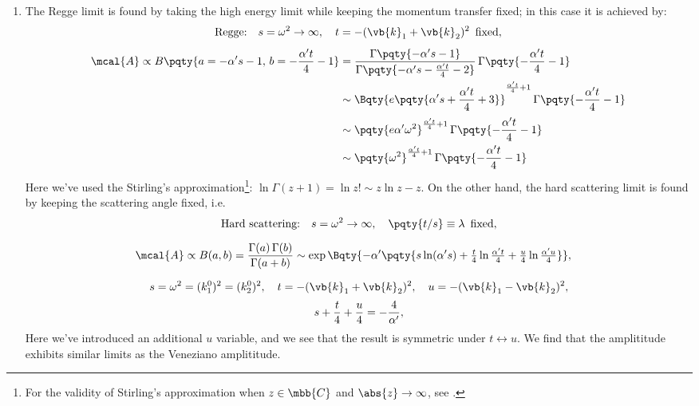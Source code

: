 \documentclass[a4paper,10pt]{article}
\begin{document}
\begin{enumerate}
\begin{enumerate}
	\item The Regge limit is found by taking the high energy limit while keeping the momentum transfer fixed; in this case it is achieved by:
	\begin{gather}
		\text{Regge:}\quad
			s = \omega^2 \to\infty,\quad
			t = - (\vb{k}_1 + \vb{k}_2)^2
				\,\ \text{fixed},
	\\[1ex]
	\begin{aligned}
		\mcal{A} \propto
			B\pqty{
				a = -\alpha's - 1,\,
				b = -\frac{\alpha't}{4} - 1
			}
		&= \frac{\Gamma\pqty{
				-\alpha's - 1
			}}{\Gamma\pqty{
				-\alpha's - \frac{\alpha't}{4} - 2
			}}\,
			\Gamma\pqty{-\frac{\alpha't}{4} - 1} \\
		&\sim \Bqty{
				e\pqty{
					\alpha's
					+ \frac{\alpha't}{4} + 3
				}
			}^{\frac{\alpha't}{4} + 1}\,
			\Gamma\pqty{-\frac{\alpha't}{4} - 1} \\[.5ex]
		&\sim \pqty{
				e\alpha'\omega^2
			}^{\frac{\alpha't}{4} + 1}\,
			\Gamma\pqty{-\frac{\alpha't}{4} - 1} \\
		&\sim \pqty{
				\omega^2
			}^{\frac{\alpha't}{4} + 1}\,
			\Gamma\pqty{-\frac{\alpha't}{4} - 1}
	\end{aligned}
	\end{gather}
	Here we've used the Stirling's approximation\footnote{
		For the validity of Stirling's approximation when $z\in\mbb{C}$ and $\abs{z}\to\infty$, see . 
	}: $
		\ln \Gamma(z + 1)
		= \ln z!
		\sim z\ln z - z
	$. On the other hand, the hard scattering limit is found by keeping the scattering angle fixed, i.e.
	\begin{gather}
		\text{Hard scattering:}\quad
			s = \omega^2 \to\infty,\quad
			\pqty{t/s} \equiv \lambda\,\ \text{fixed},
	\\[1.5ex]
	\begin{aligned}
		\mcal{A}
		\propto B(a,b)
		= \frac{\Gamma(a)\,\Gamma(b)}{
				\Gamma(a+b)
			}
		&\sim \exp\Bqty{
				-\alpha'\pqty{
					s\ln (\alpha's)
					+ \tfrac{t}{4} \ln \tfrac{\alpha't}{4}
					+ \tfrac{u}{4} \ln \tfrac{\alpha'u}{4}
				}
			},
	\end{aligned}
	\\[1.5ex]
		s = \omega^2 = (k_1^0)^2 = (k_2^0)^2,\quad
		t = - (\vb{k}_1 + \vb{k}_2)^2,\quad
		u = - (\vb{k}_1 - \vb{k}_2)^2,
	\\[.5ex]
		s + \frac{t}{4} + \frac{u}{4} = - \frac{4}{\alpha'},
	\end{gather}
	Here we've introduced an additional $u$ variable, and we see that the result is symmetric under $
		t\leftrightarrow u
	$. We find that the amplititude exhibits similar limits as the Veneziano amplititude. 
	

\end{enumerate}
\end{enumerate}
\end{document}
